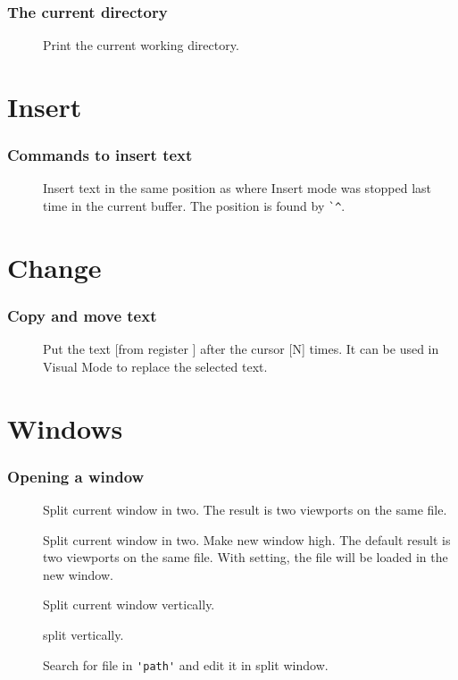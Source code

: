 \section{The current directory}
\begin{description}
  \item[] Print the current working directory.
\end{description}
\part{Insert}
\section{Commands to insert text}
\begin{description}
  \item[] Insert text in the same position as where Insert mode was stopped last time in the current buffer. The position is found by \verb|`^|.
\end{description}
\part{Change}
\section{Copy and move text}
\begin{description}
  \item[\syntax{["x][N]p]}] Put the text [from register ] after the cursor [N] times. It can be used in Visual Mode to replace the selected text.
\end{description}
\part{Windows}
%
\section{Opening a window}
\begin{description}
  \item[] Split current window in two. The result is two viewports on the same file.
  \item[] Split current window in two. Make new window  high. The default result is two viewports on the same file. With \syntax{[file]} setting, the file will be loaded in the new window.
  \item[] Split current window vertically.
  \item[] split vertically.

  \item[] Search for file in \verb|'path'| and edit it in split window.
\end{description}
